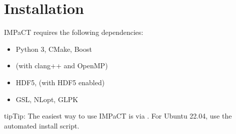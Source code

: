 \documentclass[a4paper,10pt,english]{sphinxmanual}
\begin{document}
\section{Installation}
\label{\detokenize{getting-started/installation:installation}}\label{\detokenize{getting-started/installation::doc}}
\sphinxAtStartPar
IMPaCT requires the following dependencies:
\begin{itemize}
\item {} 
\sphinxAtStartPar
Python 3, CMake, Boost

\item {} 
\sphinxAtStartPar
{} (with clang++ and OpenMP)

\item {} 
\sphinxAtStartPar
HDF5,  (with HDF5 enabled)

\item {} 
\sphinxAtStartPar
GSL, NLopt, GLPK

\end{itemize}

\begin{sphinxadmonition}{tip}{Tip:}
\sphinxAtStartPar
The easiest way to use IMPaCT is via {\hyperref[\detokenize{getting-started/docker::doc}]{}}. For Ubuntu 22.04, use the
automated install script.
\end{sphinxadmonition}
\end{document}
